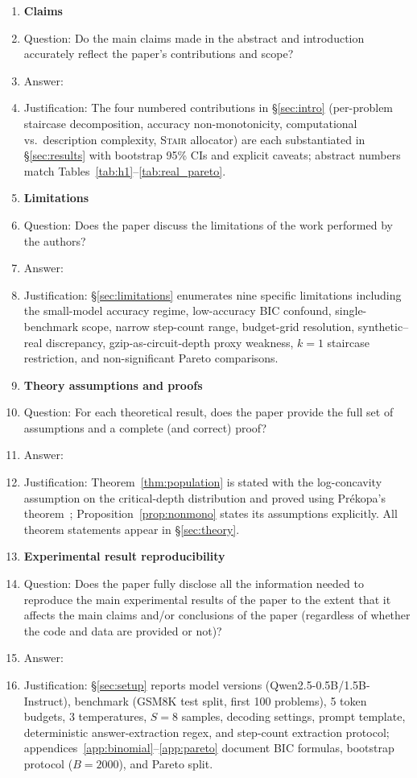 \documentclass{article}
\newcommand{\method}{\textsc{Stair}}
\begin{document}
\begin{enumerate}

\item {\bf Claims}
    \item[] Question: Do the main claims made in the abstract and introduction accurately reflect the paper's contributions and scope?
    \item[] Answer: \answerYes{}
    \item[] Justification: The four numbered contributions in \S\ref{sec:intro} (per-problem staircase decomposition, accuracy non-monotonicity, computational vs.\ description complexity, \method{} allocator) are each substantiated in \S\ref{sec:results} with bootstrap 95\% CIs and explicit caveats; abstract numbers match Tables~\ref{tab:h1}--\ref{tab:real_pareto}.

\item {\bf Limitations}
    \item[] Question: Does the paper discuss the limitations of the work performed by the authors?
    \item[] Answer: \answerYes{}
    \item[] Justification: \S\ref{sec:limitations} enumerates nine specific limitations including the small-model accuracy regime, low-accuracy BIC confound, single-benchmark scope, narrow step-count range, budget-grid resolution, synthetic--real discrepancy, gzip-as-circuit-depth proxy weakness, $k{=}1$ staircase restriction, and non-significant Pareto comparisons.

\item {\bf Theory assumptions and proofs}
    \item[] Question: For each theoretical result, does the paper provide the full set of assumptions and a complete (and correct) proof?
    \item[] Answer: \answerYes{}
    \item[] Justification: Theorem~\ref{thm:population} is stated with the log-concavity assumption on the critical-depth distribution and proved using Pr\'ekopa's theorem~\citep{prekopa1973logconcave}; Proposition~\ref{prop:nonmono} states its assumptions explicitly. All theorem statements appear in \S\ref{sec:theory}.

\item {\bf Experimental result reproducibility}
    \item[] Question: Does the paper fully disclose all the information needed to reproduce the main experimental results of the paper to the extent that it affects the main claims and/or conclusions of the paper (regardless of whether the code and data are provided or not)?
    \item[] Answer: \answerYes{}
    \item[] Justification: \S\ref{sec:setup} reports model versions (Qwen2.5-0.5B/1.5B-Instruct), benchmark (GSM8K test split, first 100 problems), 5 token budgets, 3 temperatures, $S{=}8$ samples, decoding settings, prompt template, deterministic answer-extraction regex, and step-count extraction protocol; appendices~\ref{app:binomial}--\ref{app:pareto} document BIC formulas, bootstrap protocol ($B{=}2000$), and Pareto split.


\end{enumerate}
\end{document}
